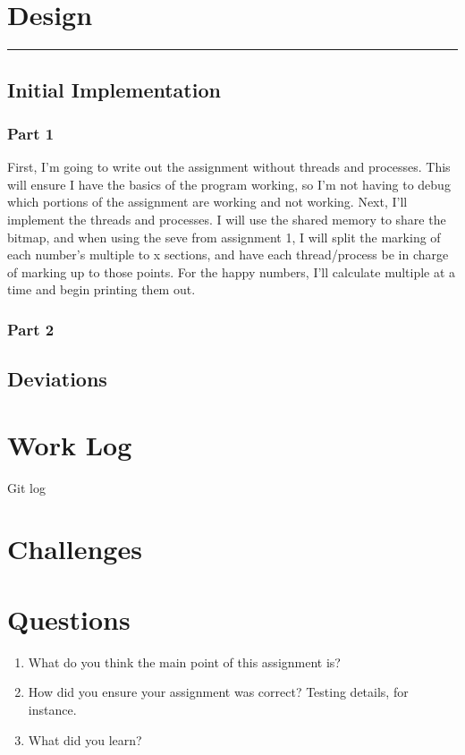 \documentclass[fleqn,10pt,titlepage]{article}
\begin{document}
\section{Design}
\hrule
\subsection{Initial Implementation}
\subsubsection{Part 1}
First, I'm going to write out the assignment without threads and processes. This
will ensure I have the basics of the program working, so I'm not having to debug which
portions of the assignment are working and not working. Next, I'll implement the threads and
processes. I will use the shared memory to share the bitmap, and when using the seve from
assignment 1, I will split the marking of each number's multiple to x sections, and have 
each thread/process be in charge of marking up to those points. For the happy numbers, I'll
calculate multiple at a time and begin printing them out.
\subsubsection{Part 2}
\subsection{Deviations}
\clearpage

\section{Work Log}
Git log
\clearpage

\section{Challenges}
\begin{itemize}
\end{itemize}
\clearpage

\section{Questions}
\begin{enumerate}
\item What do you think the main point of this assignment is? \\ 
\item How did you ensure your assignment was correct? Testing details, for instance. \\ 
\item What did you learn? \\ 
\end{enumerate}
\end{document}

